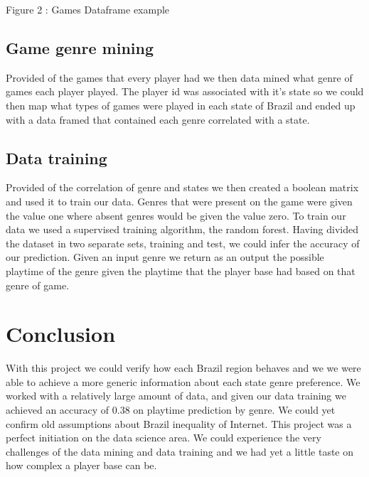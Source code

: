 \documentclass[review]{elsarticle}
\begin{document}
{Figure 2 : Games Dataframe example}

\subsection*{Game genre mining}
Provided of the games that every player had we then data mined what genre of games each player played. The player id was associated with it's state so we could then map what types of games were played in each state of Brazil and ended up with a data framed that contained each genre correlated with a state.

\subsection{Data training}
Provided of the correlation of genre and states we then created a boolean matrix and used it to train our data. Genres that were present on the game were given the value one where absent genres would be given the value zero. To train our data we used a supervised training algorithm, the random forest. Having divided the dataset in two separate sets, training and test, we could infer the accuracy of our prediction. Given an input genre we return as an output the possible playtime of the genre given the playtime that the player base had based on that genre of game. 

\section{Conclusion}
With this project we could verify how each Brazil region behaves and we we were able to achieve a more generic information about each state genre preference. We worked with a relatively large amount of data, and given our data training we achieved an accuracy of 0.38 on playtime prediction by genre. We could yet confirm old assumptions about Brazil inequality of Internet. This project was a perfect initiation on the data science area. We could experience the very challenges of the data mining and data training and we had yet a little taste on how complex a player base can be.
\end{document}
